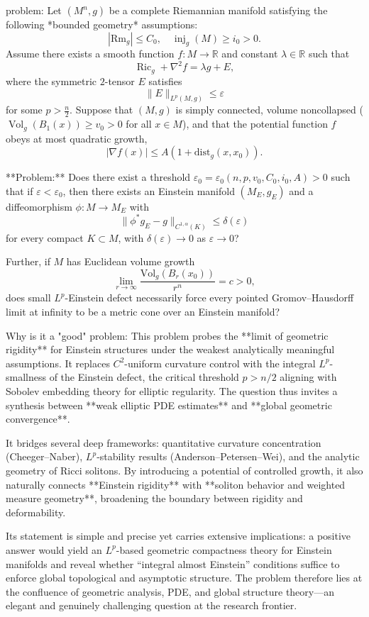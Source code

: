 problem:  
Let \((M^n, g)\) be a complete Riemannian manifold satisfying the following *bounded geometry* assumptions:  
\[
|\mathrm{Rm}_g| \le C_0, \quad \operatorname{inj}_g(M) \ge i_0 > 0.
\]
Assume there exists a smooth function \(f : M \rightarrow \mathbb{R}\) and constant \(\lambda \in \mathbb{R}\) such that  
\[
\operatorname{Ric}_g + \nabla^2 f = \lambda g + E,
\]
where the symmetric \(2\)-tensor \(E\) satisfies  
\[
\|E\|_{L^p(M,g)} \le \varepsilon
\]
for some \(p > \frac{n}{2}\). Suppose that \((M,g)\) is simply connected, volume noncollapsed (\(\operatorname{Vol}_g(B_1(x)) \ge v_0 > 0\) for all \(x\in M\)), and that the potential function \(f\) obeys at most quadratic growth,  
\[
|\nabla f(x)| \le A(1+\mathrm{dist}_g(x,x_0)).
\]  

**Problem:**  
Does there exist a threshold \(\varepsilon_0 = \varepsilon_0(n,p,v_0,C_0,i_0,A) > 0\) such that if \(\varepsilon < \varepsilon_0\), then there exists an Einstein manifold \((M_E,g_E)\) and a diffeomorphism \(\phi: M \to M_E\) with  
\[
\|\phi^* g_E - g\|_{C^{1,\alpha}(K)} \le \delta(\varepsilon)
\]
for every compact \(K \subset M\), with \(\delta(\varepsilon) \to 0\) as \(\varepsilon \to 0\)?  

Further, if \(M\) has Euclidean volume growth  
\[
\lim_{r\to\infty}\frac{\mathrm{Vol}_g(B_r(x_0))}{r^n} = c > 0,
\]  
does small \(L^p\)-Einstein defect necessarily force every pointed Gromov–Hausdorff limit at infinity to be a metric cone over an Einstein manifold?  

Why is it a "good" problem:  
This problem probes the **limit of geometric rigidity** for Einstein structures under the weakest analytically meaningful assumptions. It replaces \(C^2\)-uniform curvature control with the integral \(L^p\)-smallness of the Einstein defect, the critical threshold \(p>n/2\) aligning with Sobolev embedding theory for elliptic regularity. The question thus invites a synthesis between **weak elliptic PDE estimates** and **global geometric convergence**.  

It bridges several deep frameworks: quantitative curvature concentration (Cheeger–Naber), \(L^p\)-stability results (Anderson–Petersen–Wei), and the analytic geometry of Ricci solitons. By introducing a potential of controlled growth, it also naturally connects **Einstein rigidity** with **soliton behavior and weighted measure geometry**, broadening the boundary between rigidity and deformability.  

Its statement is simple and precise yet carries extensive implications: a positive answer would yield an \(L^p\)-based geometric compactness theory for Einstein manifolds and reveal whether “integral almost Einstein” conditions suffice to enforce global topological and asymptotic structure. The problem therefore lies at the confluence of geometric analysis, PDE, and global structure theory—an elegant and genuinely challenging question at the research frontier.